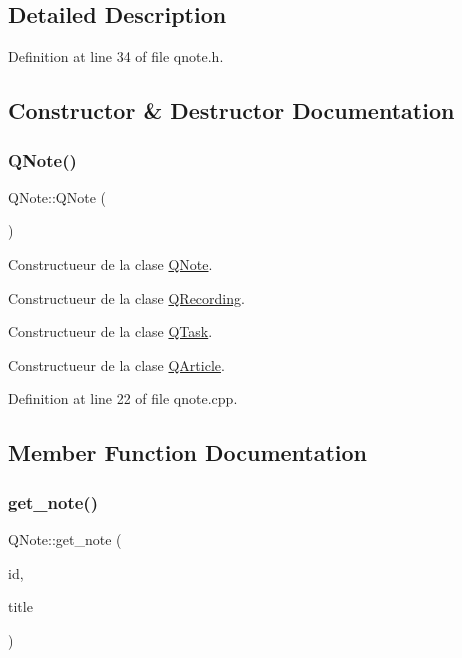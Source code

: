 \subsection{Detailed Description}


Definition at line 34 of file qnote.\+h.



\subsection{Constructor \& Destructor Documentation}
\mbox{\label{class_q_note_a4f3980466d58be3cb5e15d2e45d74840}} 
\subsubsection{\texorpdfstring{Q\+Note()}{QNote()}}
{\footnotesize\ttfamily Q\+Note\+::\+Q\+Note (\begin{DoxyParamCaption}{ }\end{DoxyParamCaption})}



Constructueur de la clase \hyperlink{class_q_note}{Q\+Note}. 

Constructueur de la clase \hyperlink{class_q_recording}{Q\+Recording}.

Constructueur de la clase \hyperlink{class_q_task}{Q\+Task}.

Constructueur de la clase \hyperlink{class_q_article}{Q\+Article}. 

Definition at line 22 of file qnote.\+cpp.



\subsection{Member Function Documentation}
\mbox{\label{class_q_note_a899d74d257db09590cd27a02ebad65da}} 
\subsubsection{\texorpdfstring{get\+\_\+note()}{get\_note()}}
{\footnotesize\ttfamily Q\+Note\+::get\+\_\+note (\begin{DoxyParamCaption}\item[{Q\+String}]{id,  }\item[{Q\+String}]{title }\end{DoxyParamCaption})\hspace{0.3cm}{\ttfamily [pure virtual]}}



